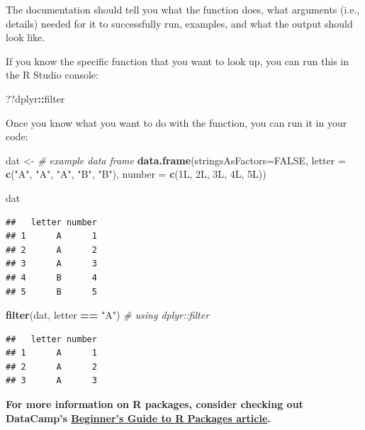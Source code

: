 \documentclass[]{book}
\newenvironment{Shaded}{\begin{snugshade}}{\end{snugshade}}
\newcommand{\KeywordTok}[1]{\textcolor[rgb]{0.13,0.29,0.53}{\textbf{#1}}}
\newcommand{\DataTypeTok}[1]{\textcolor[rgb]{0.13,0.29,0.53}{#1}}
\newcommand{\StringTok}[1]{\textcolor[rgb]{0.31,0.60,0.02}{#1}}
\newcommand{\CommentTok}[1]{\textcolor[rgb]{0.56,0.35,0.01}{\textit{#1}}}
\newcommand{\OtherTok}[1]{\textcolor[rgb]{0.56,0.35,0.01}{#1}}
\newcommand{\OperatorTok}[1]{\textcolor[rgb]{0.81,0.36,0.00}{\textbf{#1}}}
\newcommand{\NormalTok}[1]{#1}
\begin{document}
The documentation should tell you what the function does, what arguments
(i.e., details) needed for it to successfully run, examples, and what
the output should look like.

If you know the specific function that you want to look up, you can run
this in the R Studio console:

\begin{Shaded}
\begin{Highlighting}[]
\NormalTok{??dplyr}\OperatorTok{::}\NormalTok{filter}
\end{Highlighting}
\end{Shaded}

Once you know what you want to do with the function, you can run it in
your code:

\begin{Shaded}
\begin{Highlighting}[]
\NormalTok{dat <-}\StringTok{ }\CommentTok{# example data frame}
\StringTok{    }\KeywordTok{data.frame}\NormalTok{(}\DataTypeTok{stringsAsFactors=}\OtherTok{FALSE}\NormalTok{,}
               \DataTypeTok{letter =} \KeywordTok{c}\NormalTok{(}\StringTok{"A"}\NormalTok{, }\StringTok{"A"}\NormalTok{, }\StringTok{"A"}\NormalTok{, }\StringTok{"B"}\NormalTok{, }\StringTok{"B"}\NormalTok{),}
               \DataTypeTok{number =} \KeywordTok{c}\NormalTok{(1L, 2L, 3L, 4L, 5L))}

\NormalTok{dat}
\end{Highlighting}
\end{Shaded}

\begin{verbatim}
##   letter number
## 1      A      1
## 2      A      2
## 3      A      3
## 4      B      4
## 5      B      5
\end{verbatim}

\begin{Shaded}
\begin{Highlighting}[]
\KeywordTok{filter}\NormalTok{(dat, letter }\OperatorTok{==}\StringTok{ "A"}\NormalTok{) }\CommentTok{# using dplyr::filter}
\end{Highlighting}
\end{Shaded}

\begin{verbatim}
##   letter number
## 1      A      1
## 2      A      2
## 3      A      3
\end{verbatim}

\textbf{For more information on R packages, consider checking out
DataCamp's
\href{https://www.datacamp.com/community/tutorials/r-packages-guide}{Beginner's
Guide to R Packages article}.}
\end{document}
